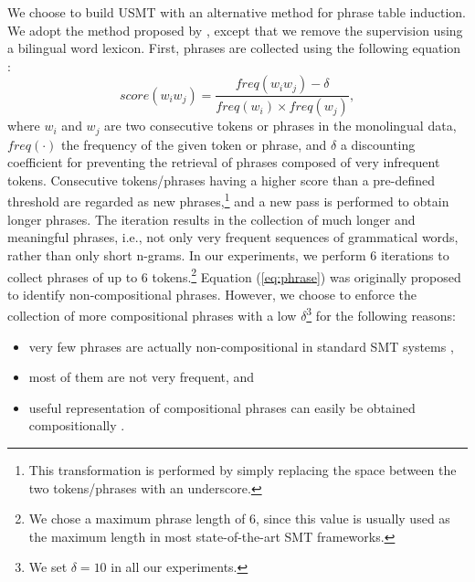 \documentclass[11pt,a4paper]{article}
\newcommand{\Eq}[1]{{Equation (\ref{eq:#1})}}
\begin{document}
We choose to build USMT with an alternative method for phrase table induction. We adopt the method proposed by \citet{Marie:2018:PTI:3184403.3168054}, except that we remove the supervision using a bilingual word lexicon. First, phrases are collected using the following equation \citep{Mikolov:2013:DRW:2999792.2999959}:
\begin{equation}
\label{eq:phrase}
\mathit{score}(w_i w_j) = \frac{\mathit{freq}(w_i w_j)-\delta}{\mathit{freq}(w_i) \times \mathit{freq}(w_j)},
\end{equation}
where $w_i$ and $w_j$ are two consecutive tokens or phrases in the monolingual data, $\mathit{freq}(\cdot)$ the frequency of the given token or phrase, and $\delta$ a discounting coefficient for preventing the retrieval of phrases composed of very infrequent tokens. Consecutive tokens/phrases having a higher score than a pre-defined threshold are regarded as new phrases,\footnote{This transformation is performed by simply replacing the space between the two tokens/phrases with an underscore.} and a new pass is performed to obtain longer phrases.
The iteration results in the collection of much longer and meaningful phrases, i.e., not only very frequent sequences of grammatical words, rather than only short n-grams. In our experiments, we perform 6 iterations to collect phrases of up to 6 tokens.\footnote{We chose a maximum phrase length of 6, since this value is usually used as the maximum length in most state-of-the-art SMT frameworks.} \Eq{phrase} was originally proposed to identify non-compositional phrases. However, we choose to enforce the collection of more compositional phrases with a low $\delta$\footnote{We set $\delta=10$ in all our experiments.} for the following reasons:
\begin{itemize}\itemsep=0mm
\item very few phrases are actually non-compositional in standard SMT systems \citep{D12-1089},
\item most of them are not very frequent, and
\item useful representation of compositional phrases can easily be obtained compositionally \citep{N15-1176}.
\end{itemize}
\end{document}
